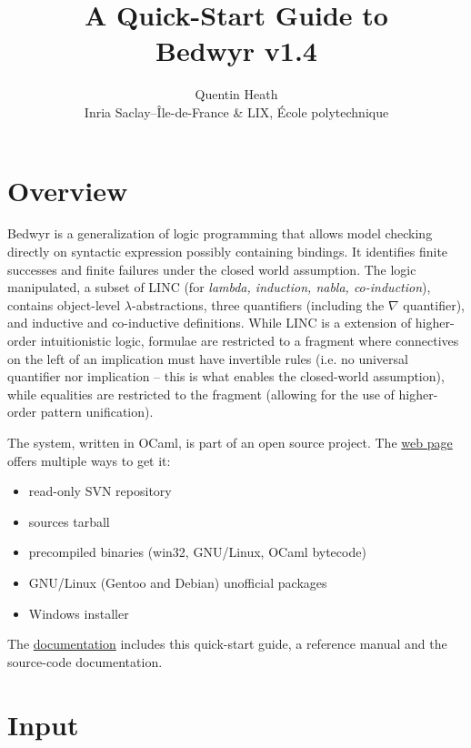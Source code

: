 \documentclass[a4paper,twocolumn]{article}
\title{{\Huge A Quick-Start Guide to\\Bedwyr v1.4}}
\author{Quentin Heath\\
        Inria Saclay--\^Ile-de-France \& LIX, \'Ecole polytechnique}
\begin{document}
\maketitle

\section{Overview}

Bedwyr is a generalization of logic programming that allows model checking
directly on syntactic expression possibly containing bindings.  It identifies
finite successes and finite failures under the closed world assumption.  The
logic manipulated, a subset of LINC (for \emph{lambda, induction, nabla,
co-induction}), contains object-level $\lambda$-abstractions, three quantifiers
(including the $\nabla$ quantifier), and inductive and co-inductive
definitions.  While LINC is a extension of higher-order intuitionistic logic,
formulae are restricted to a fragment where connectives on the left of an
implication must have invertible rules (i.e. no universal quantifier nor
implication -- this is what enables the closed-world assumption), while equalities are
restricted to the \Ll{} fragment (allowing for the use of higher-order pattern
unification).

The system, written in OCaml, is part of an open source project.
The \href{http://slimmer.gforge.inria.fr/bedwyr/#download}{web page}
offers multiple ways to get it:
\begin{itemize}
  \item read-only SVN repository
  \item sources tarball
  \item precompiled binaries (win32, GNU/Linux, OCaml bytecode)
  \item GNU/Linux (Gentoo and Debian) unofficial packages
  \item Windows installer
\end{itemize}

The \href{http://slimmer.gforge.inria.fr/bedwyr/#documentation}{documentation}
includes this quick-start guide, a reference manual and the source-code
documentation.

\section{Input}
\end{document}
